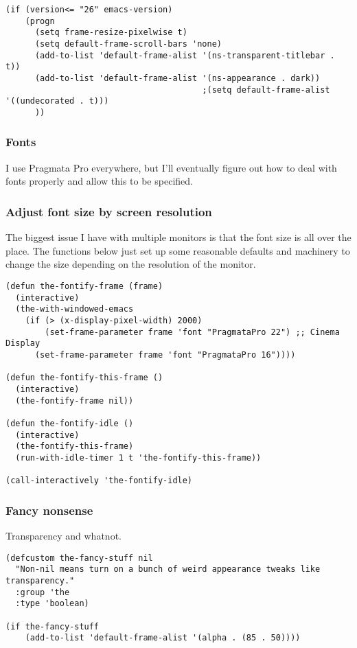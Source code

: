 \documentclass[11pt]{article}
\begin{document}
\begin{verbatim}
(if (version<= "26" emacs-version)
    (progn
      (setq frame-resize-pixelwise t)
      (setq default-frame-scroll-bars 'none)
      (add-to-list 'default-frame-alist '(ns-transparent-titlebar . t))
      (add-to-list 'default-frame-alist '(ns-appearance . dark))
                                        ;(setq default-frame-alist '((undecorated . t)))
      ))
\end{verbatim}

\subsubsection{Fonts}
\label{sec:orgcbf05a2}
I use Pragmata Pro everywhere, but I'll eventually figure out how to
deal with fonts properly and allow this to be specified.

\subsubsection{Adjust font size by screen resolution}
\label{sec:org9a93fef}
The biggest issue I have with multiple monitors is that the font size
is all over the place. The functions below just set up some reasonable
defaults and machinery to change the size depending on the resolution
of the monitor.

\begin{verbatim}
(defun the-fontify-frame (frame)
  (interactive)
  (the-with-windowed-emacs
    (if (> (x-display-pixel-width) 2000)
        (set-frame-parameter frame 'font "PragmataPro 22") ;; Cinema Display
      (set-frame-parameter frame 'font "PragmataPro 16"))))

(defun the-fontify-this-frame ()
  (interactive)
  (the-fontify-frame nil))

(defun the-fontify-idle ()
  (interactive)
  (the-fontify-this-frame)
  (run-with-idle-timer 1 t 'the-fontify-this-frame))

(call-interactively 'the-fontify-idle)
\end{verbatim}

\subsubsection{Fancy nonsense}
\label{sec:org555b775}
Transparency and whatnot.
\begin{verbatim}
(defcustom the-fancy-stuff nil
  "Non-nil means turn on a bunch of weird appearance tweaks like
transparency."
  :group 'the
  :type 'boolean)

(if the-fancy-stuff
    (add-to-list 'default-frame-alist '(alpha . (85 . 50))))
\end{verbatim}
\end{document}
